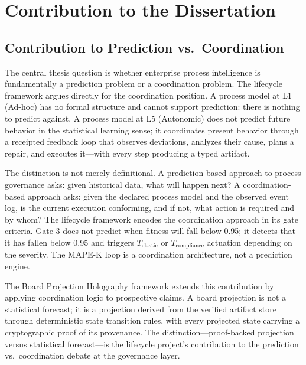 
\section{Contribution to the Dissertation}
\label{sec:lifecycle-contribution}

\subsection{Contribution to Prediction vs.~Coordination}
\label{sec:lifecycle-contribution-prediction}

The central thesis question is whether enterprise process intelligence is fundamentally
a prediction problem or a coordination problem. The lifecycle framework argues directly
for the coordination position. A process model at L1 (Ad-hoc) has no formal structure
and cannot support prediction: there is nothing to predict against. A process model at
L5 (Autonomic) does not predict future behavior in the statistical learning sense; it
coordinates present behavior through a receipted feedback loop that observes deviations,
analyzes their cause, plans a repair, and executes it---with every step producing a
typed artifact.

The distinction is not merely definitional. A prediction-based approach to process
governance asks: given historical data, what will happen next? A coordination-based
approach asks: given the declared process model and the observed event log, is the
current execution conforming, and if not, what action is required and by whom? The
lifecycle framework encodes the coordination approach in its gate criteria. Gate 3 does
not predict when fitness will fall below 0.95; it detects that it has fallen below 0.95
and triggers $T_{\mathrm{elastic}}$ or $T_{\mathrm{compliance}}$ actuation depending on
the severity. The MAPE-K loop is a coordination architecture, not a prediction engine.

The Board Projection Holography framework extends this contribution by applying
coordination logic to prospective claims. A board projection is not a statistical
forecast; it is a projection derived from the verified artifact store through
deterministic state transition rules, with every projected state carrying a cryptographic
proof of its provenance. The distinction---proof-backed projection versus statistical
forecast---is the lifecycle project's contribution to the prediction vs.~coordination
debate at the governance layer.

